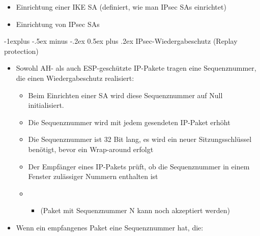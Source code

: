 \documentclass[a4paper]{article}
\makeatletter
\renewcommand{\subsection}{\@startsection{subsection}{2}{0mm}%
 {-1explus -.5ex minus -.2ex}%
 {0.5ex plus .2ex}%
 {\normalfont\normalsize\bfseries}}
\makeatother
\begin{document}
\begin{multicols}{3}
\begin{itemize}
\begin{itemize}
\begin{itemize}
                                  \begin{itemize}
                                      \item
                                            Einrichtung einer IKE SA (definiert, wie man IPsec SAs
                                            einrichtet)
                                      \item
                                            Einrichtung von IPsec SAs
                                  \end{itemize}
                        \end{itemize}
              \end{itemize}
    \end{itemize}


    \subsection{IPsec-Wiedergabeschutz (Replay
        protection)}

    \begin{itemize}
        \item
              Sowohl AH- als auch ESP-geschützte IP-Pakete tragen eine
              Sequenznummer, die einen Wiedergabeschutz realisiert:

              \begin{itemize}
                  \item
                        Beim Einrichten einer SA wird diese Sequenznummer auf Null
                        initialisiert.
                  \item
                        Die Sequenznummer wird mit jedem gesendeten IP-Paket erhöht
                  \item
                        Die Sequenznummer ist 32 Bit lang, es wird ein neuer
                        Sitzungsschlüssel benötigt, bevor ein Wrap-around erfolgt
                  \item
                        Der Empfänger eines IP-Pakets prüft, ob die Sequenznummer in einem
                        Fenster zulässiger Nummern enthalten ist
                  \item

                        \begin{itemize}
                            \item
                                  (Paket mit Sequenznummer N kann noch akzeptiert werden)
                        \end{itemize}
              \end{itemize}
        \item
              Wenn ein empfangenes Paket eine Sequenznummer hat, die:


\end{itemize}
\end{multicols}
\end{document}
